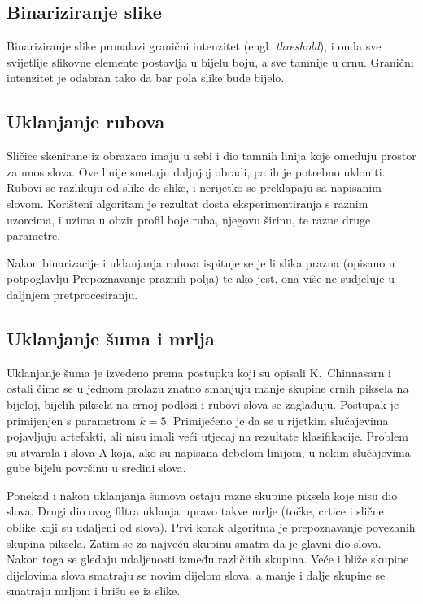 \documentclass[a4paper,twocolumn,dvipdfm]{article}
\begin{document}
\subsection{Binariziranje slike}
Binariziranje slike pronalazi granični intenzitet (engl. \emph{threshold}), i
onda sve svijetlije slikovne elemente postavlja u bijelu boju, a sve tamnije u crnu.
Granični intenzitet je odabran tako da bar pola slike bude bijelo.

\subsection{Uklanjanje rubova}
Sličice skenirane iz obrazaca imaju u sebi i dio tamnih linija koje omeđuju
prostor za unos slova. Ove linije smetaju daljnjoj obradi, pa ih je potrebno
ukloniti. Rubovi se razlikuju od slike do slike, i nerijetko se preklapaju sa
napisanim slovom. Korišteni algoritam je rezultat dosta eksperimentiranja s
raznim uzorcima, i uzima u obzir profil boje ruba, njegovu širinu, te razne
druge parametre.

Nakon binarizacije i uklanjanja rubova ispituje se je li slika prazna (opisano u
potpoglavlju Prepoznavanje praznih polja) te ako jest, ona više ne sudjeluje u
daljnjem pretprocesiranju.

\subsection{Uklanjanje šuma i mrlja}
Uklanjanje šuma je izvedeno prema postupku koji su opisali K.\ Chinnasarn i
ostali \cite{chinnasarn2002removing} čime se u jednom prolazu znatno smanjuju
manje skupine crnih piksela na bijeloj, bijelih piksela na crnoj podlozi i
rubovi slova se zaglađuju. Postupak je primijenjen s parametrom $k = 5$.
Primijećeno je da se u rijetkim slučajevima pojavljuju artefakti, ali nisu imali
veći utjecaj na rezultate klasifikacije. Problem su stvarala i slova A koja, ako
su napisana debelom linijom, u nekim slučajevima gube bijelu površinu u sredini
slova.

Ponekad i nakon uklanjanja šumova ostaju razne skupine piksela koje nisu dio
slova. Drugi dio ovog filtra uklanja upravo takve mrlje (točke, crtice i slične
oblike koji su udaljeni od slova). Prvi korak algoritma je prepoznavanje
povezanih skupina piksela. Zatim se za najveću skupinu smatra da je glavni dio
slova. Nakon toga se gledaju udaljenosti između različitih skupina. Veće i
bliže skupine dijelovima slova smatraju se novim dijelom slova, a manje i dalje
skupine se smatraju mrljom i brišu se iz slike.
\end{document}
